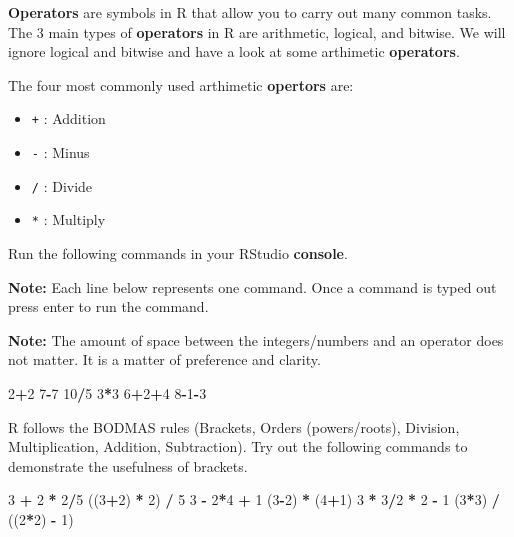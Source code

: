 \documentclass[]{book}
\newenvironment{Shaded}{\begin{snugshade}}{\end{snugshade}}
\newcommand{\DecValTok}[1]{\textcolor[rgb]{0.00,0.00,0.81}{#1}}
\newcommand{\StringTok}[1]{\textcolor[rgb]{0.31,0.60,0.02}{#1}}
\newcommand{\OperatorTok}[1]{\textcolor[rgb]{0.81,0.36,0.00}{\textbf{#1}}}
\newcommand{\NormalTok}[1]{#1}
\providecommand{\tightlist}{%
  \setlength{\itemsep}{0pt}\setlength{\parskip}{0pt}}
\begin{document}
\textbf{Operators} are symbols in R that allow you to carry out many
common tasks. The 3 main types of \textbf{operators} in R are
arithmetic, logical, and bitwise. We will ignore logical and bitwise and
have a look at some arthimetic \textbf{operators}.

The four most commonly used arthimetic \textbf{opertors} are:

\begin{itemize}
\tightlist
\item
  \texttt{+} : Addition
\item
  \texttt{-} : Minus
\item
  \texttt{/} : Divide
\item
  \texttt{*} : Multiply
\end{itemize}

Run the following commands in your RStudio \textbf{console}.

\textbf{Note:} Each line below represents one command. Once a command is
typed out press enter to run the command.

\textbf{Note:} The amount of space between the integers/numbers and an
operator does not matter. It is a matter of preference and clarity.

\begin{Shaded}
\begin{Highlighting}[]
\DecValTok{2}\OperatorTok{+}\DecValTok{2}
\DecValTok{7}\OperatorTok{-}\DecValTok{7}
\DecValTok{10}\OperatorTok{/}\DecValTok{5}
\DecValTok{3}\OperatorTok{*}\DecValTok{3}
\DecValTok{6}\OperatorTok{+}\DecValTok{2}\OperatorTok{+}\DecValTok{4}
\DecValTok{8}\OperatorTok{-}\DecValTok{1}\OperatorTok{-}\DecValTok{3}
\end{Highlighting}
\end{Shaded}

R follows the BODMAS rules (Brackets, Orders (powers/roots), Division,
Multiplication, Addition, Subtraction). Try out the following commands
to demonstrate the usefulness of brackets.

\begin{Shaded}
\begin{Highlighting}[]
\DecValTok{3} \OperatorTok{+}\StringTok{ }\DecValTok{2} \OperatorTok{*}\StringTok{ }\DecValTok{2}\OperatorTok{/}\DecValTok{5}
\NormalTok{((}\DecValTok{3}\OperatorTok{+}\DecValTok{2}\NormalTok{) }\OperatorTok{*}\StringTok{ }\DecValTok{2}\NormalTok{) }\OperatorTok{/}\StringTok{ }\DecValTok{5}
\DecValTok{3} \OperatorTok{-}\StringTok{ }\DecValTok{2}\OperatorTok{*}\DecValTok{4} \OperatorTok{+}\StringTok{ }\DecValTok{1}
\NormalTok{(}\DecValTok{3}\OperatorTok{-}\DecValTok{2}\NormalTok{) }\OperatorTok{*}\StringTok{ }\NormalTok{(}\DecValTok{4}\OperatorTok{+}\DecValTok{1}\NormalTok{)}
\DecValTok{3} \OperatorTok{*}\StringTok{ }\DecValTok{3}\OperatorTok{/}\DecValTok{2} \OperatorTok{*}\StringTok{ }\DecValTok{2} \OperatorTok{-}\StringTok{ }\DecValTok{1}
\NormalTok{(}\DecValTok{3}\OperatorTok{*}\DecValTok{3}\NormalTok{) }\OperatorTok{/}\StringTok{ }\NormalTok{((}\DecValTok{2}\OperatorTok{*}\DecValTok{2}\NormalTok{) }\OperatorTok{-}\StringTok{ }\DecValTok{1}\NormalTok{)}
\end{Highlighting}
\end{Shaded}
\end{document}
